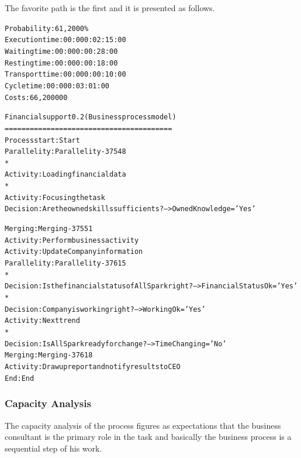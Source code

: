 The favorite path is the first and it is presented as follows.\\

\begin{alltt}
Probability:   61,2000\%
Execution time:  00:000:02:15:00
Waiting time:  00:000:00:28:00
Resting time:  00:000:00:18:00
Transport time:  00:000:00:10:00
Cycle time:  00:000:03:01:00
Costs:  66,200000

Financial support 0.2 (Business process model)
========================================
Process start: Start
Parallelity: Parallelity-37548
    *
    Activity: Loading financial data
    *
    Activity: Focusing the task
    Decision: Are the owned skills sufficients? --> OwnedKnowledge='Yes'

Merging: Merging-37551
Activity: Perform business activity
Activity: Update Company information
Parallelity: Parallelity-37615
    *
    Decision: Is the financial status of AllSpark right? --> FinancialStatusOk='Yes'
    *
    Decision: Company is working right? --> WorkingOk='Yes'
    Activity: Next trend
    *
    Decision: Is AllSpark ready for change? --> TimeChanging='No'
Merging: Merging-37618
Activity: Draw up report and notify results to CEO
End: End
\end{alltt}


\subsubsection{Capacity Analysis}
The capacity analysis of the process figures as expectations that the business consultant is the primary role in the task and basically the business process is a sequential step of his work.

